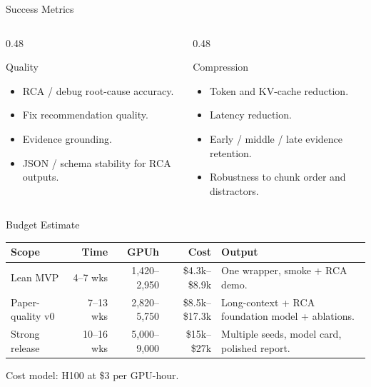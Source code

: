 \begin{frame}{Success Metrics}
  \begin{columns}[T]
    \begin{column}{0.48\textwidth}
      \begin{block}{Quality}
        \begin{itemize}
          \item RCA / debug root-cause accuracy.
          \item Fix recommendation quality.
          \item Evidence grounding.
          \item JSON / schema stability for RCA outputs.
        \end{itemize}
      \end{block}
    \end{column}
    \begin{column}{0.48\textwidth}
      \begin{block}{Compression}
        \begin{itemize}
          \item Token and KV-cache reduction.
          \item Latency reduction.
          \item Early / middle / late evidence retention.
          \item Robustness to chunk order and distractors.
        \end{itemize}
      \end{block}
    \end{column}
  \end{columns}
\end{frame}

\begin{frame}{Budget Estimate}
  \begin{table}
    \small
    \begin{tabular}{p{} r r r p{}}
      \toprule
      Scope & Time & GPUh & Cost & Output \\
      \midrule
      Lean MVP & 4--7 wks & 1,420--2,950 & \$4.3k--\$8.9k & One wrapper, smoke + RCA demo. \\
      Paper-quality v0 & 7--13 wks & 2,820--5,750 & \$8.5k--\$17.3k & Long-context + RCA foundation model + ablations. \\
      Strong release & 10--16 wks & 5,000--9,000 & \$15k--\$27k & Multiple seeds, model card, polished report. \\
      \bottomrule
    \end{tabular}
  \end{table}

  \vspace{0.4em}
  Cost model: H100 at \$3 per GPU-hour.
\end{frame}


